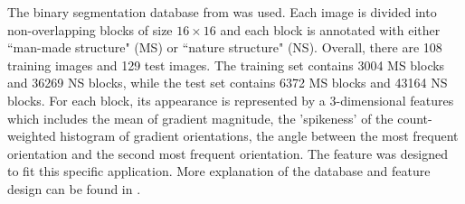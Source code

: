 The binary segmentation database from \cite{img_seg_database} was used.  Each image is divided into non-overlapping blocks of 
size $16\times16$ and each block is annotated with either ``man-made structure" (MS) or ``nature structure" (NS). 
Overall, there are 108 training images and 129 test images. The training set contains 3004 MS blocks and 36269 NS blocks, while the test set 
contains 6372 MS blocks and 43164 NS blocks.
For each block, its appearance is 
represented by a 3-dimensional features which includes the mean of gradient magnitude, the 'spikeness' of the count-weighted histogram of gradient orientations, 
the angle between the most frequent orientation and the second most frequent orientation. The feature was designed to fit this specific application.        
More explanation of the database and feature design can be found in \cite{img_seg_database}. 


